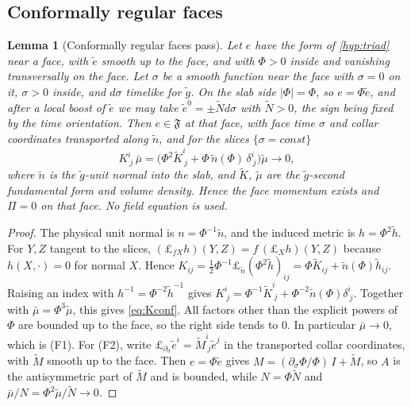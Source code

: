 \documentclass[11pt]{article}
\theoremstyle{canonmath}
\newtheorem{lemma}[theorem]{Lemma}
\theoremstyle{canonpostulate}
\theoremstyle{canonproposition}
\theoremstyle{canonmath}
\theoremstyle{canonproposition}
\providecommand{\Fcl}{\mathfrak{F}}
\def\mathrm#1{#1}%
\begin{document}
\subsection{Conformally regular faces}

\begin{lemma}[Conformally regular faces pass]\label{lem:B0}
Let $e$ have the form of \ref{hyp:triad} near a face, with $\tilde e$ smooth up to the face, and with $\Phi>0$ inside and vanishing transversally on the face. Let $\sigma$ be a smooth function near the face with $\sigma=0$ on it, $\sigma>0$ inside, and $d\sigma$ timelike for $\tilde g$. On the slab side $|\Phi| = \Phi$, so $e = \Phi\tilde e$, and after a local boost of $\tilde e$ we may take $\tilde e^0 = \pm\tilde N d\sigma$ with $\tilde N>0$, the sign being fixed by the time orientation. Then $e\in\Fcl$ at that face, with face time $\sigma$ and collar coordinates transported along $\tilde n$, and for the slices $\{\sigma = \mathrm{const}\}$
\begin{equation}
K^i_{\ j}\,\bar\mu = \bigl(\Phi^2\tilde K^i_{\ j} + \Phi\,\tilde n(\Phi)\,\delta^i_{\ j}\bigr)\tilde\mu \longrightarrow 0,
\label{eq:Kconf}
\end{equation}
where $\tilde n$ is the $\tilde g$-unit normal into the slab, and $\tilde K$, $\tilde\mu$ are the $\tilde g$-second fundamental form and volume density. Hence the face momentum exists and $\Pi = 0$ on that face. No field equation is used.
\end{lemma}

\begin{proof}
The physical unit normal is $n = \Phi^{-1}\tilde n$, and the induced metric is $h = \Phi^2\tilde h$. For $Y,Z$ tangent to the slices, $(\pounds_{fX}h)(Y,Z) = f\,(\pounds_Xh)(Y,Z)$ because $h(X,\cdot) = 0$ for normal $X$. Hence $K_{ij} = \tfrac12\Phi^{-1}\pounds_{\tilde n}(\Phi^2\tilde h)_{ij} = \Phi\tilde K_{ij} + \tilde n(\Phi)\tilde h_{ij}$. Raising an index with $h^{-1} = \Phi^{-2}\tilde h^{-1}$ gives $K^i_{\ j} = \Phi^{-1}\tilde K^i_{\ j} + \Phi^{-2}\tilde n(\Phi)\delta^i_{\ j}$. Together with $\bar\mu = \Phi^3\tilde\mu$, this gives \eqref{eq:Kconf}. All factors other than the explicit powers of $\Phi$ are bounded up to the face, so the right side tends to $0$. In particular $\bar\mu\to0$, which is (F1). For (F2), write $\pounds_{\partial_\sigma}\tilde e^i = \tilde M^i_{\ j}\tilde e^j$ in the transported collar coordinates, with $\tilde M$ smooth up to the face. Then $e = \Phi\tilde e$ gives $M = (\partial_\sigma\Phi/\Phi)\,I + \tilde M$, so $A$ is the antisymmetric part of $\tilde M$ and is bounded, while $N = \Phi\tilde N$ and $\bar\mu/N = \Phi^2\tilde\mu/\tilde N\to0$.
\end{proof}
\end{document}
